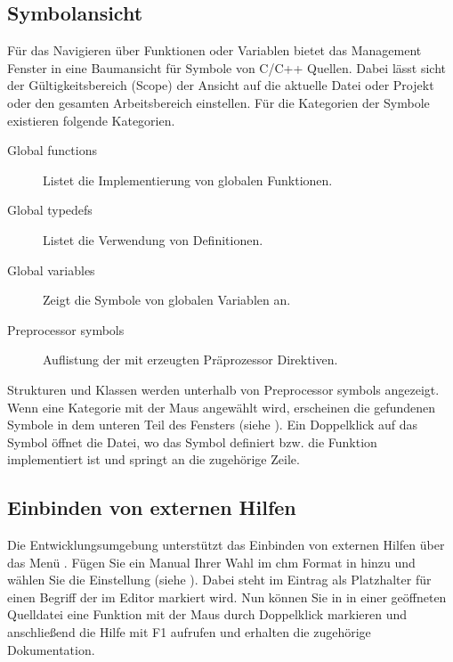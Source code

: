 \subsection{Symbolansicht}

Für das Navigieren über Funktionen oder Variablen bietet das Management Fenster in \codeblocks eine Baumansicht für Symbole von C/C++ Quellen. Dabei lässt sicht der Gültigkeitsbereich (Scope) der Ansicht auf die aktuelle Datei oder Projekt oder den gesamten Arbeitsbereich einstellen. Für die Kategorien der Symbole existieren folgende Kategorien.


\begin{description}
\item[Global functions] Listet die Implementierung von globalen Funktionen.
\item[Global typedefs] Listet die Verwendung von  Definitionen.
\item[Global variables] Zeigt die Symbole von globalen Variablen an.
\item[Preprocessor symbols] Auflistung der mit  erzeugten Präprozessor Direktiven.
\end{description}

Strukturen und Klassen werden unterhalb von Preprocessor symbols angezeigt. Wenn eine Kategorie mit der Maus angewählt wird, erscheinen die gefundenen Symbole in dem unteren Teil des Fensters (siehe ). Ein Doppelklick auf das Symbol öffnet die Datei, wo das Symbol definiert bzw. die Funktion implementiert ist und springt an die zugehörige Zeile.


\subsection{Einbinden von externen Hilfen}

Die Entwicklungsumgebung \codeblocks unterstützt das Einbinden von externen Hilfen über das Menü . Fügen Sie ein Manual Ihrer Wahl im chm Format in  hinzu und wählen Sie die Einstellung  (siehe ). Dabei steht im Eintrag  als Platzhalter für einen Begriff der im Editor markiert wird.  Nun können Sie in \codeblocks in einer geöffneten Quelldatei eine Funktion mit der Maus durch Doppelklick markieren und anschließend die Hilfe mit F1 aufrufen und erhalten die zugehörige Dokumentation.

